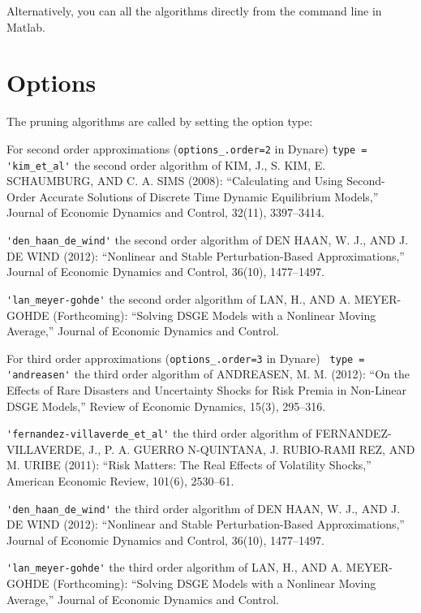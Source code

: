 \documentclass[12pt,leqno,subeqn,aer,aertt,harvard,ulem]{article}
\begin{document}
Alternatively, you can all the algorithms directly from the command line in Matlab.




\section{Options}

The pruning algorithms are called by setting the option type:

 For second order approximations (\verb!options_.order=2! in Dynare)
\verb!type =! 
\verb!'kim_et_al'! the second order algorithm of 
               KIM, J., S. KIM, E. SCHAUMBURG, AND C. A. SIMS (2008): “Calculating and Using Second-
               Order Accurate Solutions of Discrete Time Dynamic Equilibrium Models,” Journal of Economic
               Dynamics and Control, 32(11), 3397–3414.

\verb!'den_haan_de_wind'! the second order algorithm of
               DEN HAAN, W. J., AND J. DE WIND (2012): “Nonlinear and Stable Perturbation-Based Approximations,”
               Journal of Economic Dynamics and Control, 36(10), 1477–1497.

\verb!'lan_meyer-gohde'! the second order algorithm of 
               LAN, H., AND A. MEYER-GOHDE (Forthcoming): “Solving DSGE Models with a Nonlinear Moving Average,” Journal of
               Economic Dynamics and Control.


 For third order approximations (\verb!options_.order=3! in Dynare)
\verb! type =! 
\verb!'andreasen'! the third order algorithm of 
               ANDREASEN, M. M. (2012): “On the Effects of Rare Disasters and Uncertainty Shocks for Risk
               Premia in Non-Linear DSGE Models,” Review of Economic Dynamics, 15(3), 295–316.

\verb!'fernandez-villaverde_et_al'! the third order algorithm of
               FERNANDEZ-VILLAVERDE, J., P. A. GUERRO N-QUINTANA, J. RUBIO-RAMI REZ, AND
               M. URIBE (2011): “Risk Matters: The Real Effects of Volatility Shocks,” American Economic
               Review, 101(6), 2530–61.

\verb!'den_haan_de_wind'! the third order algorithm of
               DEN HAAN, W. J., AND J. DE WIND (2012): “Nonlinear and Stable Perturbation-Based Approximations,”
               Journal of Economic Dynamics and Control, 36(10), 1477–1497.

\verb!'lan_meyer-gohde'! the third order algorithm of 
               LAN, H., AND A. MEYER-GOHDE (Forthcoming): “Solving DSGE Models with a Nonlinear Moving Average,” Journal of
               Economic Dynamics and Control.
\end{document}
